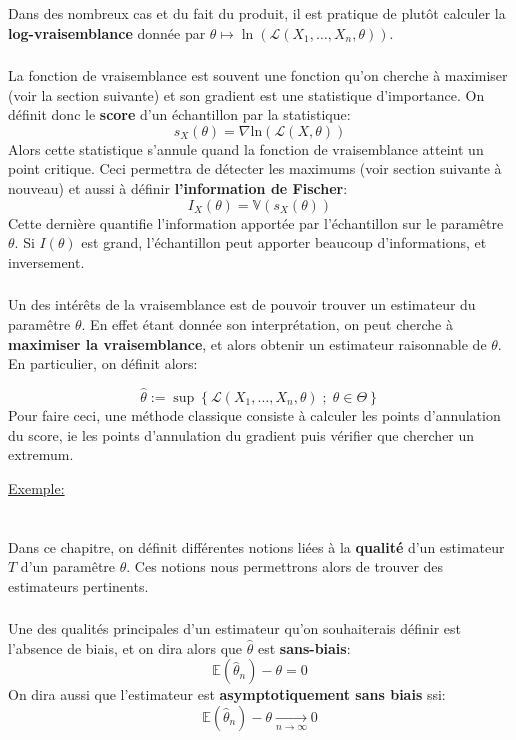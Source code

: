 Dans des nombreux cas et du fait du produit, il est pratique de plutôt calculer la \textbf{log-vraisemblance} donnée par \( \theta \mapsto \ln( \mathcal{L}(X_1, \ldots, X_n, \theta)) \). 
\subsection*{}
La fonction de vraisemblance est souvent une fonction qu'on cherche à maximiser (voir la section suivante) et son gradient est une statistique d'importance. On définit donc le \textbf{score} d'un échantillon par la statistique:
\[ 
   s_X(\theta) = \nabla \text{ln}(\mathcal{L}(X, \theta)) 
\]
Alors cette statistique s'annule quand la fonction de vraisemblance atteint un point critique. Ceci permettra de détecter les maximums (voir section suivante à nouveau) et aussi à définir \textbf{l'information de Fischer}:
\[ 
   I_X(\theta) = \mathbb{V}(s_X(\theta))
\]
Cette dernière quantifie l'information apportée par l'échantillon sur le paramêtre \(\theta\). Si \( I(\theta) \) est grand, l'échantillon peut apporter beaucoup d'informations, et inversement.
\subsection*{}
Un des intérêts de la vraisemblance est de pouvoir trouver un estimateur du paramêtre \( \theta \). En effet étant donnée son interprétation, on peut cherche à \textbf{maximiser la vraisemblance}, et alors obtenir un estimateur raisonnable de \( \theta \). En particulier, on définit alors:

\[ 
   \hat{\theta} := \sup \left\{ \mathcal{L}(X_1, \ldots, X_n, \theta) \; ; \; \theta \in \Theta  \right\}
\]
Pour faire ceci, une méthode classique consiste à calculer les points d'annulation du score, ie les points d'annulation du gradient puis vérifier que chercher un extremum.\<

\uline{Exemple:}
\chapter*{} %
Dans ce chapitre, on définit différentes notions liées à la \textbf{qualité} d'un estimateur \( T \) d'un paramêtre \( \theta \). Ces notions nous permettrons alors de trouver des estimateurs pertinents.

\subsection*{}
Une des qualités principales d'un estimateur qu'on souhaiterais définir est l'absence de biais, et on dira alors que \( \hat{ \theta} \) est \textbf{sans-biais}:
\[ 
   \mathbb{E}(\hat{\theta}_n) - \theta = 0
\]
On dira aussi que l'estimateur est \textbf{asymptotiquement sans biais} ssi:
\[ 
   \mathbb{E}(\hat{\theta}_n) - \theta \underset{n \longrightarrow \infty}{ \longrightarrow} 0
\]
